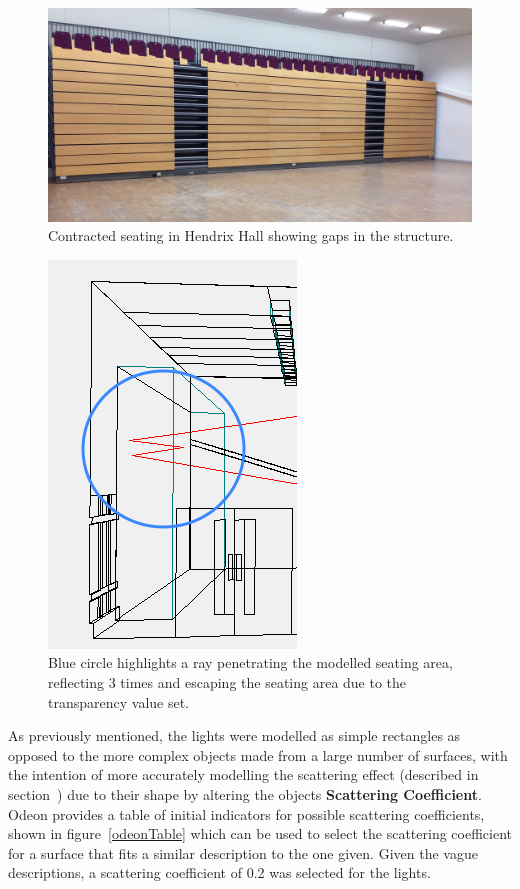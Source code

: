 \documentclass[../../main.tex]{subfiles}
\begin{document}
			\begin{figure}[h]
				\centerline{\includegraphics[width=\textwidth]{Sections/Implementation/Odeon/images/seating.jpg}}
				\caption{Contracted seating in Hendrix Hall showing gaps in the structure.}
				\label{seating}
			\end{figure}

			\begin{figure}
				\center\includegraphics[scale = 0.7]{Sections/Implementation/Odeon/images/OdeonRays/transparencyEdit/singleRay2_edit3.PNG}
				\caption{Blue circle highlights a ray penetrating the modelled seating area, reflecting 3 times and escaping the seating area due to the transparency value set.}
				\label{transparency}
			\end{figure}

			As previously mentioned, the lights were modelled as simple rectangles as opposed to the more complex objects made from a large number of surfaces, with the intention of more accurately modelling the scattering effect (described in section~) due to their shape by altering the objects \textbf{Scattering Coefficient}. Odeon provides a table of initial indicators for possible scattering coefficients, shown in figure~\ref{odeonTable} which can be used to select the scattering coefficient for a surface that fits a similar description to the one given. Given the vague descriptions, a scattering coefficient of 0.2 was selected for the lights.
\end{document}
